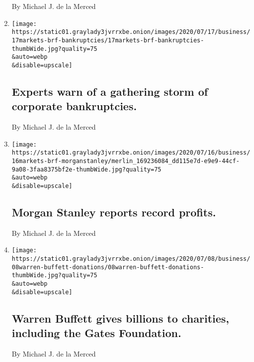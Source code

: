 \begin{enumerate}
  By Michael J. de la Merced
\item
  \href{/2020/07/17/business/experts-warn-of-a-gathering-storm-of-corporate-bankruptcies.html}{}

  \texttt{[image: https://static01.graylady3jvrrxbe.onion/images/2020/07/17/business/17markets-brf-bankruptcies/17markets-brf-bankruptcies-thumbWide.jpg?quality=75\\\&auto=webp\\\&disable=upscale]}

  \hypertarget{experts-warn-of-a-gathering-storm-of-corporate-bankruptcies}{%
  \subsection{Experts warn of a gathering storm of corporate
  bankruptcies.}\label{experts-warn-of-a-gathering-storm-of-corporate-bankruptcies}}

  By Michael J. de la Merced
\item
  \href{/2020/07/16/business/morgan-stanley-reports-record-profits.html}{}

  \texttt{[image: https://static01.graylady3jvrrxbe.onion/images/2020/07/16/business/16markets-brf-morganstanley/merlin\_169236084\_dd115e7d-e9e9-44cf-9a08-3faa8375bf2e-thumbWide.jpg?quality=75\\\&auto=webp\\\&disable=upscale]}

  \hypertarget{morgan-stanley-reports-record-profits}{%
  \subsection{Morgan Stanley reports record
  profits.}\label{morgan-stanley-reports-record-profits}}

  By Michael J. de la Merced
\item
  \href{/live/2020/07/08/business/stock-market-today-coronavirus/warren-buffett-gives-billions-to-charities-including-the-gates-foundation}{}

  \texttt{[image: https://static01.graylady3jvrrxbe.onion/images/2020/07/08/business/08warren-buffett-donations/08warren-buffett-donations-thumbWide.jpg?quality=75\\\&auto=webp\\\&disable=upscale]}

  \hypertarget{warren-buffett-gives-billions-to-charities-including-the-gates-foundation}{%
  \subsection{Warren Buffett gives billions to charities, including the
  Gates
  Foundation.}\label{warren-buffett-gives-billions-to-charities-including-the-gates-foundation}}

  By Michael J. de la Merced
\end{enumerate}

